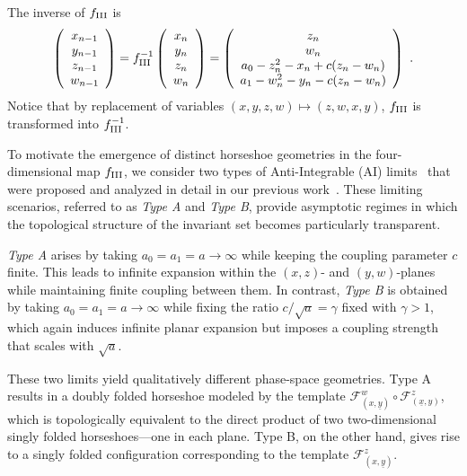 \documentclass[12pt]{iopart}
\begin{document}
The inverse of $f_{\rm III}$ is 
\begin{equation}\label{eq:4D doubly folded Henon inverse}
\left( \begin{array}{ccc}
x_{n-1}\\
y_{n-1} \\
z_{n-1} \\
w_{n-1} \end{array} \right) = 
f^{-1}_{\rm III} \left( \begin{array}{ccc}
x_{n}\\
y_{n} \\
z_{n}\\
w_{n} \end{array} \right) =
\left( \begin{array}{ccc}
z_n \\
w_n \\
a_0 - z^2_n - x_n + c(z_n - w_n) \\
a_1 - w^2_n - y_n - c(z_n - w_n)\end{array} \right)\ .
\end{equation}
Notice that by replacement of variables $(x,y,z,w) \mapsto (z,w,x,y)$, $f_{\rm III}$ is transformed into $f^{-1}_{\rm III}$. 

To motivate the emergence of distinct horseshoe geometries in the four-dimensional map \( f_{\rm III} \), we consider two types of Anti-Integrable (AI) limits~\cite{Aubry90} that were proposed and analyzed in detail in our previous work~\cite{Fujioka25}. These limiting scenarios, referred to as \emph{Type A} and \emph{Type B}, provide asymptotic regimes in which the topological structure of the invariant set becomes particularly transparent.

\emph{Type A} arises by taking \( a_0 = a_1 = a \to \infty \) while keeping the coupling parameter \( c \) finite. This leads to infinite expansion within the \( (x,z) \)- and \( (y,w) \)-planes while maintaining finite coupling between them. In contrast, \emph{Type B} is obtained by taking \( a_0 = a_1 = a \to \infty \) while fixing the ratio \( c/\sqrt{a} = \gamma \) fixed with $\gamma>1$, which again induces infinite planar expansion but imposes a coupling strength that scales with \( \sqrt{a} \).

These two limits yield qualitatively different phase-space geometries. Type A results in a doubly folded horseshoe modeled by the template \( \mathcal{F}^w_{(x,\underline{y})} \circ \mathcal{F}^z_{(\underline{x},y)} \), which is topologically equivalent to the direct product of two two-dimensional singly folded horseshoes---one in each plane. Type B, on the other hand, gives rise to a singly folded configuration corresponding to the template \( \mathcal{F}^z_{(x,\underline{y})} \).
\end{document}
